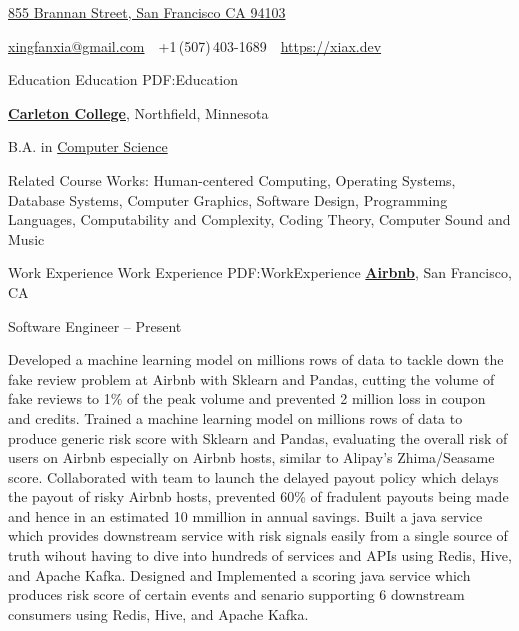\documentclass[letterpaper,MMMyyyy,nonstopmode]{simpleresumecv}
\newcommand{\CVAuthor}{Xingfan Xia}
\newcommand{\CVWebpage}{https://xiax.dev}
\begin{document}

\Title{\CVAuthor}

\begin{SubTitle}
\href{https://www.google.com/maps/place/855+Brannan,+San+Francisco,+CA+94103}
{855 Brannan Street, San Francisco CA 94103}
\par
\href{mailto:xingfanxia@gmail.com}
{xingfanxia@gmail.com}
\,\SubBulletSymbol\,
+1\,(507)\,403-1689
\,\SubBulletSymbol\,
\href{\CVWebpage}
{\url{\CVWebpage}}
\end{SubTitle}

\begin{Body}


\Section
{Education}
{Education}
{PDF:Education}

\Entry
\href{https://www.carleton.edu/}
{\textbf{Carleton College}},
Northfield, Minnesota

\Gap
\BulletItem
B.A. in
\href{https://apps.carleton.edu/curricular/cs/}
{Computer Science}
\hfill
{}
\begin{Detail}
\SubBulletItem
Related Course Works: Human-centered Computing, Operating Systems, Database Systems, Computer Graphics, Software Design, Programming Languages, Computability and Complexity, Coding Theory, Computer Sound and Music

\end{Detail}


\Section
{Work\newline
Experience}
{Work Experience}
{PDF:WorkExperience}
\Entry
\href{https://press.airbnb.com/about-us/}
{\textbf{Airbnb}},
San Francisco, CA

\Gap
\BulletItem
Software Engineer
\hfill
{} --
Present
\begin{Detail}
\SubBulletItem
Developed a machine learning model on millions rows of data to tackle down the fake review problem at Airbnb with Sklearn and Pandas, cutting the volume of fake reviews to 1\% of the peak volume and prevented 2 million loss in coupon and credits.
\SubBulletItem
Trained a machine learning model on millions rows of data to produce generic risk score with Sklearn and Pandas, evaluating the overall risk of users on Airbnb especially on Airbnb hosts, similar to Alipay's Zhima/Seasame score.
\SubBulletItem
Collaborated with team to launch the delayed payout policy which delays the payout of risky Airbnb hosts, prevented 60\% of fradulent payouts being made and hence in an estimated 10 mmillion in annual savings.
\SubBulletItem
Built a java service which provides downstream service with risk signals easily from a single source of truth wihout having to dive into hundreds of services and APIs using Redis, Hive, and Apache Kafka.
\SubBulletItem
Designed and Implemented a scoring java service which produces risk score of certain events and senario supporting 6 downstream consumers using Redis, Hive, and Apache Kafka.
\end{Detail}


\end{Body}
\end{document}

